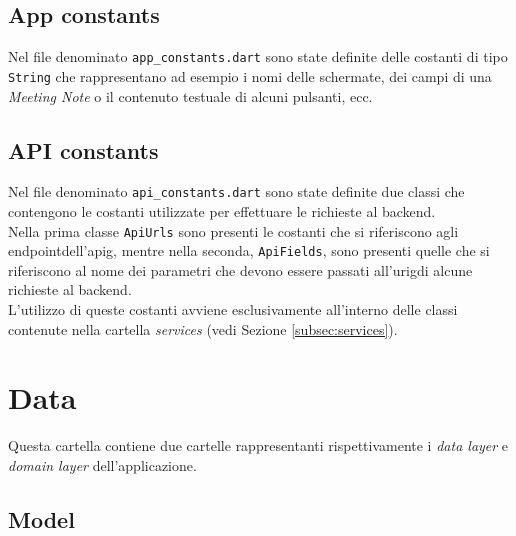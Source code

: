 \subsection{App constants}
\label{subsec:app-constants}

Nel file denominato \lstinline{app_constants.dart} sono state definite delle costanti di tipo \lstinline{String} che rappresentano ad esempio i nomi delle schermate, dei campi di una \emph{Meeting Note} o il contenuto testuale di alcuni pulsanti, ecc.

\subsection{API constants}
\label{subsec:api-constants}

Nel file denominato \lstinline{api_constants.dart} sono state definite due classi che contengono le costanti utilizzate per effettuare le richieste al \gls{backend}\glsoccur.\\
Nella prima classe \lstinline{ApiUrls} sono presenti le costanti che si riferiscono agli \gls{endpoint}\glsoccur dell'\gls{apig}\glsoccur, mentre nella seconda, \lstinline{ApiFields}, sono presenti quelle che si riferiscono al nome dei parametri che devono essere passati all'\gls{urig}\glsoccur di alcune richieste al \gls{backend}\glsoccur. \\
L'utilizzo di queste costanti avviene esclusivamente all'interno delle classi contenute nella cartella \emph{services} (vedi Sezione \ref{subsec:services}).

\section{Data}
\label{sec:data}

Questa cartella contiene due cartelle rappresentanti rispettivamente i \emph{data layer} e \emph{domain layer} dell'applicazione.

\subsection{Model}
\label{subsec:model}

